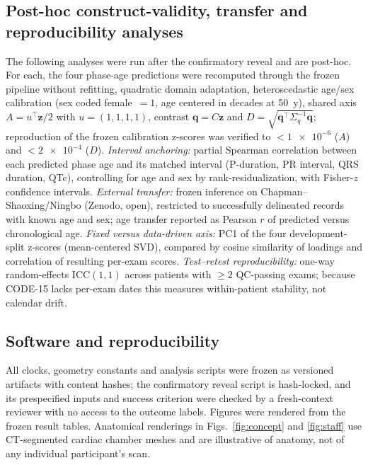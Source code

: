 \documentclass[11pt]{article}
\newcommand{\D}{\ensuremath{D}}
\newcommand{\A}{\ensuremath{A}}
\begin{document}
\subsection{Post-hoc construct-validity, transfer and reproducibility analyses}
\label{sec:posthocmethods}
The following analyses were run after the confirmatory reveal and are post-hoc. For each,
the four phase-age predictions were recomputed through the frozen pipeline without
refitting, quadratic domain adaptation, heteroscedastic age/sex calibration (sex coded
female~$=1$, age centered in decades at 50~y), shared axis $\A=u^{\top}\mathbf{z}/2$ with
$u=(1,1,1,1)$, contrast $\mathbf{q}=C\mathbf{z}$ and $\D=\sqrt{\mathbf{q}^{\top}\Sigma_q^{-1}\mathbf{q}}$;
reproduction of the frozen calibration z-scores was verified to $<\num{1e-6}$ (\A) and
$<\num{2e-4}$ (\D). \emph{Interval anchoring:} partial Spearman correlation between each
predicted phase age and its matched interval (P-duration, PR interval, QRS duration, QTc),
controlling for age and sex by rank-residualization, with Fisher-$z$ confidence intervals.
\emph{External transfer:} frozen inference on Chapman--Shaoxing/Ningbo (Zenodo, open),
restricted to successfully delineated records with known age and sex; age transfer reported
as Pearson $r$ of predicted versus chronological age. \emph{Fixed versus data-driven axis:}
PC1 of the four development-split z-scores (mean-centered SVD), compared by cosine similarity
of loadings and correlation of resulting per-exam scores. \emph{Test--retest reproducibility:}
one-way random-effects $\mathrm{ICC}(1,1)$ across patients with $\ge 2$ QC-passing exams;
because CODE-15 lacks per-exam dates this measures within-patient stability, not calendar
drift.

\subsection{Software and reproducibility}
All clocks, geometry constants and analysis scripts were frozen as versioned artifacts
with content hashes; the confirmatory reveal script is hash-locked, and its prespecified
inputs and success criterion were checked by a fresh-context reviewer with no access to the
outcome labels. Figures were rendered from the frozen result tables. Anatomical renderings in
Figs.~\ref{fig:concept} and \ref{fig:staff} use CT-segmented cardiac chamber meshes and
are illustrative of anatomy, not of any individual participant's scan.
\end{document}
